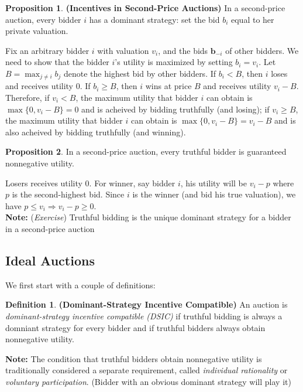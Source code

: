 \documentclass[10pt]{article}
\def\imp{\Rightarrow}
\theoremstyle{definition}
\newtheorem{defn}{Definition}[section]
\newtheorem{prop}{Proposition}[section]
\newcommand{\Note}[0]{\noindent\textbf{Note: }}
\begin{document}
\begin{prop}
	\textbf{(Incentives in Second-Price Auctions)} In a second-price auction, every bidder $i$ has a dominant strategy:
	set the bid $b_{i}$ equal to her private valuation.
\end{prop}
\proof Fix an arbitrary bidder $i$ with valuation $v_{i}$, and the bids $\textbf{b}_{-i}$ of other bidders.
We need to show that the bidder $i$'s utility is maximized by setting $b_{i} = v_{i}$.
Let $B = \max_{j\neq i}b_{j}$ denote the highest bid by other bidders. If $b_{i} < B$, then $i$ loses and receives utility $0$.
If $b_{i} \ge B$, then $i$ wins at price $B$ and receives utility $v_{i} - B$. Therefore, if $v_{i} < B$, the maximum utility
that bidder $i$ can obtain is $\max\{0, v_{i} - B\} = 0$ and is acheived by bidding truthfully (and losing); if $v_{i} \ge B$,
the maximum utility that bidder $i$ can obtain is $\max\{0, v_{i} - B\} = v_{i} - B$ and is also acheived by bidding truthfully
(and winning). \qedhere

\begin{prop}
	In a second-price auction, every truthful bidder is guaranteed nonnegative utility.
\end{prop}
\proof Losers receives utility $0$. For winner, say bidder $i$, his utility will be $v_{i} - p$ where $p$ is the second-highest bid.
Since $i$ is the winner (and bid his true valuation), we have $p \le v_{i} \imp v_{i} - p \ge 0$. \qedhere
\text{}\\

\Note (\textit{Exercise}) Truthful bidding is the unique dominant strategy for a bidder in a second-price auction

\subsection{Ideal Auctions}

We first start with a couple of definitions:
\begin{defn} \textbf{(Dominant-Strategy Incentive Compatible)}
	An auction is \textit{dominant-strategy incentive compatible (DSIC)} if truthful bidding is always a domniant strategy for every bidder and
	if truthful bidders always obtain nonnegative utility.
\end{defn}

\Note The condition that truthful bidders obtain nonnegative utility is traditionally considered a separate requirement,
called \textit{individual rationality} or \textit{voluntary participation}. (Bidder with an obvious dominant strategy will play it)
\end{document}
